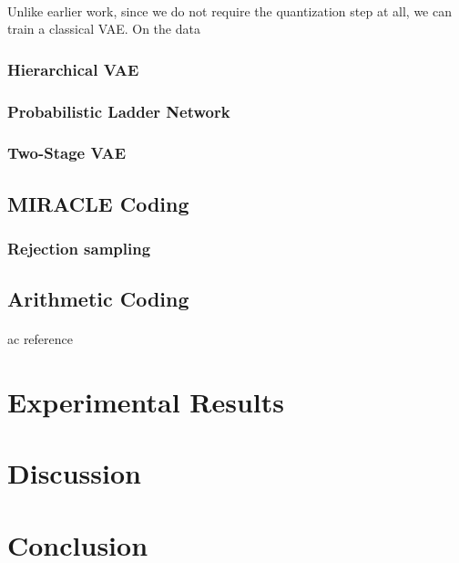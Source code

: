 \documentclass{article}
\begin{document}
\paragraph{}
Unlike earlier work, since we do not require the quantization step at all, we
can train a classical VAE. On the data

\subsubsection{Hierarchical VAE}
\paragraph{}

\subsubsection{Probabilistic Ladder Network}
\paragraph{}

\subsubsection{Two-Stage VAE}
\paragraph{}
\cite{dai2019diagnosing}

\subsection{MIRACLE Coding}
\paragraph{}
\cite{havasi2018minimal}

\subsubsection{Rejection sampling}
\paragraph{}
\cite{harsha2007communication}

\subsection{Arithmetic Coding}
\paragraph{}
ac reference \cite{rissanen1981universal}

\section{Experimental Results}

\cite{zhao2015loss}
\section{Discussion}
\section{Conclusion}

\printbibliography
\end{document}
